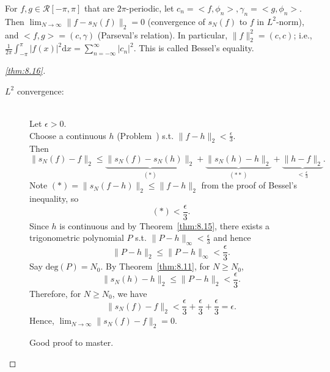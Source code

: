 \begin{thm}[16]
	For $f,g \in \mathscr{R}[-\pi,\pi]$ that are $2\pi$-periodic,
	let $c_n= <f, \phi_n>, \gamma_n = < g, \phi_n>$.
	Then $\lim_{N\to \infty}{\|f-s_N(f)\|_2}=0$ (convergence of $s_N(f)$ to $f$ in $L^2$-norm), and $<f,g> = (c,\gamma)$ (Parseval's relation).
	In particular, $\|f\|_2^{2}=(c,c)$; i.e., $\frac{1}{2\pi}\int_{-\pi}^{\pi}{\left|f(x)\right|^2\mathrm{d}x}=\sum_{n=-\infty}^{\infty}{\left|c_n\right|^2}$.
	This is called Bessel's equality.
\end{thm}
\begin{proof}[\ref{thm:8.16}]
	\begin{description}
		\item[$L^2$ convergence:]\hfill \\
		      Let $\epsilon>0$. \\
		      Choose a continuous $h$ (Problem~) s.t. $\|f-h\|_2 < \frac{\epsilon}{3}$.\\
		      Then \[
			      \|s_N(f)-f\|_{2}\le \underbrace{\|s_N(f)-s_N(h)\|_2}_{(*)}+\underbrace{\|s_N(h)-h\|_{2}}_{(**)}+\underbrace{\|h-f\|_2}_{<\frac{\epsilon}{3}}
			      .\]
		      Note $(*)= \|s_N(f-h)\|_2 \le \|f-h\|_2$ from the proof of Bessel's inequality, so \[
			      (*)<\frac{\epsilon}{3}
			      .\]
		      Since $h$ is continuous and  by Theorem~\ref{thm:8.15}, there exists a trigonometric polynomial $P$ s.t. $\|P-h\|_{\infty}<\frac{\epsilon}{3}$ and hence \[
			      \|P-h\|_2 \le  \|P-h\|_{\infty}<\frac{\epsilon}{3}
			      .\]
		      Say $\text{deg}(P)=N_{0}$. By Theorem~\ref{thm:8.11},
		      for $N\ge N_{0}$, \[
			      \|s_N(h)-h\|_{2}\le \|P-h\|_2<\frac{\epsilon}{3}
			      .\]
		      Therefore, for $N\ge N_{0}$, we have
		      \[
			      \|s_N(f)-f\|_2<\frac{\epsilon}{3}+\frac{\epsilon}{3}+\frac{\epsilon}{3}=\epsilon
			      .\]
		      Hence, $\lim_{N\to \infty}{\|s_N(f)-f\|_2}=0$.
		      \begin{remark}
			      Good proof to master.
		      \end{remark}


\end{description}
\end{proof}
